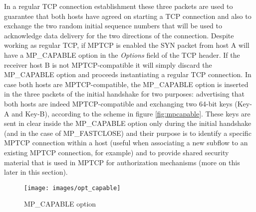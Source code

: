 In a regular TCP connection establishment these three packets are used to guarantee that both hosts have agreed on starting a TCP connection and also to exchange the two random initial sequence numbers that will be used to acknowledge data delivery for the two directions of the connection. Despite working as regular TCP, if MPTCP is enabled the SYN packet from host A will have a MP\_CAPABLE option in the \textit{Options} field of the TCP header. If the receiver host B is not MPTCP-compatible it will simply discard the MP\_CAPABLE option and proceeds instantiating a regular TCP connection.
In case both hosts are MPTCP-compatible, the MP\_CAPABLE option is inserted in the three packets of the initial handshake for two purposes: advertising that both hosts are indeed MPTCP-compatible and exchanging two 64-bit keys (Key-A and Key-B), according to the scheme in figure \ref{fig:mpcapable}.
These keys are sent in clear inside the MP\_CAPABLE option only during the initial handshake (and in the case of MP\_FASTCLOSE) and their purpose is to identify a specific MPTCP connection within a host (useful when associating a new subflow to an existing MPTCP connection, for example) and to provide shared security material that is used in MPTCP for authorization mechanisms (more on this later in this section). 

\begin{figure}[!htb]
\centering
\texttt{[image: images/opt\_capable]}
\caption{MP\_CAPABLE option}
\label{fig:opt_capable}
\end{figure}

